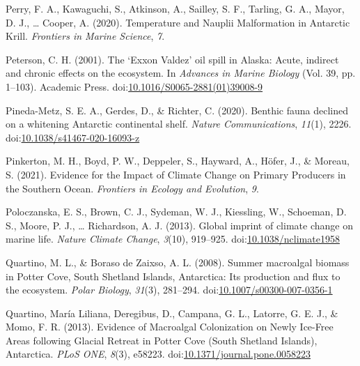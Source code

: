 \documentclass[
]{article}
\newlength{\cslhangindent}
\newenvironment{CSLReferences}[2] %
 {\begin{list}{}{%
  \setlength{\itemindent}{0pt}
  \setlength{\leftmargin}{0pt}
  \setlength{\parsep}{0pt}
  \ifodd #1
   \setlength{\leftmargin}{\cslhangindent}
   \setlength{\itemindent}{-1\cslhangindent}
  \fi
  \setlength{\itemsep}{#2\baselineskip}}}
 {\end{list}}
\begin{document}
\begin{CSLReferences}{1}{0}
Perry, F. A., Kawaguchi, S., Atkinson, A., Sailley, S. F., Tarling, G.
A., Mayor, D. J., \ldots{} Cooper, A. (2020).
Temperature and {Nauplii
Malformation} in {Antarctic Krill}. \emph{Frontiers in Marine Science},
\emph{7}.

Peterson, C. H. (2001). The {`{Exxon Valdez}'} oil spill in {Alaska}:
{Acute}, indirect and chronic effects on the ecosystem. In
\emph{Advances in {Marine Biology}} (Vol. 39, pp. 1--103). {Academic
Press}.
doi:\href{https://doi.org/10.1016/S0065-2881(01)39008-9}{10.1016/S0065-2881(01)39008-9}

Pineda-Metz, S. E. A., Gerdes, D., \& Richter, C. (2020). Benthic fauna
declined on a whitening {Antarctic} continental shelf. \emph{Nature
Communications}, \emph{11}(1), 2226.
doi:\href{https://doi.org/10.1038/s41467-020-16093-z}{10.1038/s41467-020-16093-z}

Pinkerton, M. H., Boyd, P. W., Deppeler, S., Hayward, A., Höfer, J., \&
Moreau, S. (2021). Evidence for the {Impact} of {Climate Change} on
{Primary Producers} in the {Southern Ocean}. \emph{Frontiers in Ecology
and Evolution}, \emph{9}.

Poloczanska, E. S., Brown, C. J., Sydeman, W. J., Kiessling, W.,
Schoeman, D. S., Moore, P. J., \ldots{} Richardson, A. J. (2013). Global
imprint of climate change on marine life. \emph{Nature Climate Change},
\emph{3}(10), 919--925.
doi:\href{https://doi.org/10.1038/nclimate1958}{10.1038/nclimate1958}

Quartino, M. L., \& Boraso de Zaixso, A. L. (2008). Summer macroalgal
biomass in {Potter Cove}, {South Shetland Islands}, {Antarctica}: Its
production and flux to the ecosystem. \emph{Polar Biology},
\emph{31}(3), 281--294.
doi:\href{https://doi.org/10.1007/s00300-007-0356-1}{10.1007/s00300-007-0356-1}

Quartino, María Liliana, Deregibus, D., Campana, G. L., Latorre, G. E.
J., \& Momo, F. R. (2013). Evidence of {Macroalgal Colonization} on
{Newly Ice-Free Areas} following {Glacial Retreat} in {Potter Cove}
({South Shetland Islands}), {Antarctica}. \emph{PLoS ONE}, \emph{8}(3),
e58223.
doi:\href{https://doi.org/10.1371/journal.pone.0058223}{10.1371/journal.pone.0058223}


\end{CSLReferences}
\end{document}
